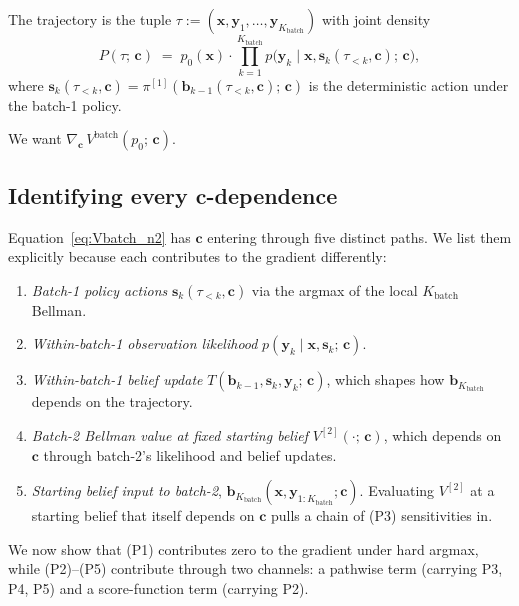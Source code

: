 \documentclass[11pt,a4paper]{article}
\newcommand{\bc}{\bm{c}}
\newcommand{\bx}{\bm{x}}
\newcommand{\by}{\bm{y}}
\newcommand{\bs}{\bm{s}}
\newcommand{\bb}{\bm{b}}
\begin{document}
The trajectory is the tuple $\tau := (\bx, \by_1, \ldots, \by_{K_\mathrm{batch}})$ with
joint density
\begin{equation}
P(\tau;\, \bc) \;=\; p_0(\bx) \cdot \prod_{k=1}^{K_\mathrm{batch}} p\bigl(\by_k \mid \bx, \bs_k(\tau_{<k}, \bc);\, \bc\bigr),
\label{eq:trajdensity}
\end{equation}
where $\bs_k(\tau_{<k}, \bc) = \pi^{[1]}(\bb_{k-1}(\tau_{<k}, \bc);\, \bc)$ is the
deterministic action under the batch-1 policy.

We want $\nabla_{\bc}\, V^\mathrm{batch}(p_0;\, \bc)$.

\subsection{Identifying every \texorpdfstring{$\bc$}{c}-dependence}
\label{sec:c_dependences}

Equation~\eqref{eq:Vbatch_n2} has $\bc$ entering through five distinct paths.  We list
them explicitly because each contributes to the gradient differently:

\begin{enumerate}[nosep,leftmargin=2em]
\item[(P1)] \emph{Batch-1 policy actions} $\bs_k(\tau_{<k}, \bc)$ via the argmax of the local
      $K_\mathrm{batch}$ Bellman.
\item[(P2)] \emph{Within-batch-1 observation likelihood} $p(\by_k \mid \bx, \bs_k;\, \bc)$.
\item[(P3)] \emph{Within-batch-1 belief update} $T(\bb_{k-1}, \bs_k, \by_k;\, \bc)$, which
      shapes how $\bb_{K_\mathrm{batch}}$ depends on the trajectory.
\item[(P4)] \emph{Batch-2 Bellman value at fixed starting belief}
      $V^{[2]}(\cdot;\, \bc)$, which depends on $\bc$ through batch-2's likelihood and
      belief updates.
\item[(P5)] \emph{Starting belief input to batch-2}, $\bb_{K_\mathrm{batch}}(\bx, \by_{1:K_\mathrm{batch}}; \bc)$.
      Evaluating $V^{[2]}$ at a starting belief that itself depends on $\bc$ pulls a chain
      of (P3) sensitivities in.
\end{enumerate}

We now show that (P1) contributes zero to the gradient under hard argmax, while
(P2)--(P5) contribute through two channels: a pathwise term (carrying P3, P4, P5) and a
score-function term (carrying P2).
\end{document}
